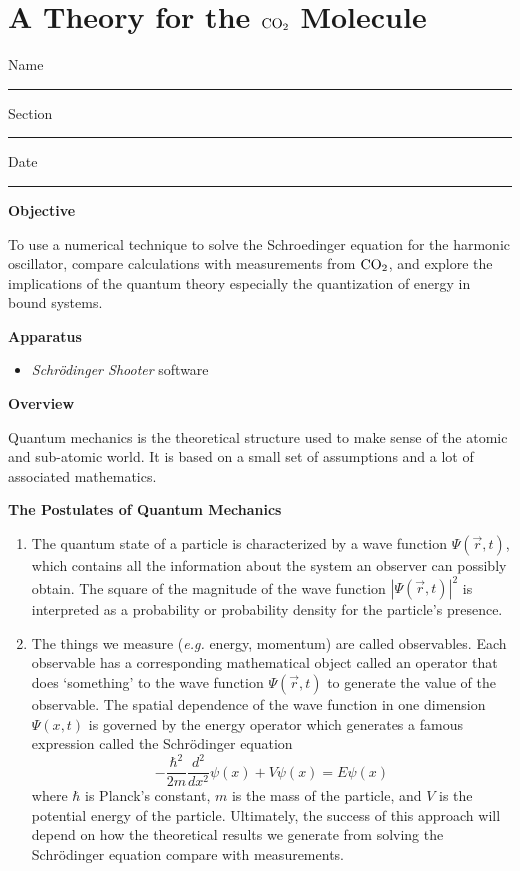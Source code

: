 \setcounter{equation}{0}
\setcounter{figure}{0}

\section{A Theory for the $\rm CO_2$ Molecule}

Name \rule{2.0in}{0.1pt}\hfill{}Section \rule{1.0in}{0.1pt}\hfill{}Date
\rule{1.0in}{0.1pt}

\textbf{Objective}

To use a numerical technique to solve the Schroedinger equation for the harmonic oscillator,
compare calculations with measurements from $\rm CO_2$,
 and explore
the implications of the quantum theory especially the quantization of energy
in bound systems.

\textbf{Apparatus}

\begin{itemize}

\item {\it Schr\"odinger Shooter} software

\end{itemize}

\textbf{Overview}

Quantum mechanics is the theoretical structure used to make sense of the atomic and sub-atomic
world. 
It is based on a small set of assumptions and a lot of associated mathematics.

\begin{center}
\bf The Postulates of Quantum Mechanics
\end{center}

\begin{enumerate}

\item The quantum state of a particle is characterized by a wave function  
$\Psi(\vec r,t)$, which contains all the information about the system an observer can 
possibly obtain.
The square of the magnitude of the wave function $|\Psi (\vec r,t)|^2$ 
is interpreted as a probability or probability density for the particle's presence. 

\item The things we measure ({\it e.g.} energy, momentum) are called observables. 
Each observable has a corresponding mathematical object called an operator 
that does `something' to the wave function $\Psi(\vec r,t)$ to generate the value of the observable.
The spatial dependence of the wave function in one dimension $\Psi(x,t)$ is governed by
the energy operator which generates a famous expression called the
Schr\"odinger equation
\begin{equation}
-\frac{\hbar^2}{2 m}\frac{d^2}{d x^2} \psi(x) + V \psi(x) = E  \psi(x)
\end{equation}
where $\hbar$ is Planck's constant, $m$ is the mass of the particle, and $V$ is the potential
energy of the particle.
Ultimately, the success of this approach will depend on how the theoretical
results we generate from solving the Schr\"odinger equation compare with
measurements.

\end{enumerate}

